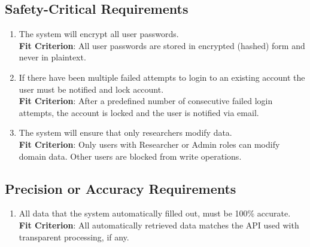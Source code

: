 \documentclass[12pt]{article}
\begin{document}
\subsection{Safety-Critical Requirements}
\begin{enumerate}[label=PR-SC\arabic*]
  \item The system will encrypt all user passwords.
  \\ \textbf{Fit Criterion}: All user passwords are stored in encrypted (hashed) form and never in plaintext.
  \item If there have been multiple failed attempts to login to an existing account the user must be notified and lock account.
  \\ \textbf{Fit Criterion}: After a predefined number of consecutive failed login attempts, the account is locked and the user is notified via email.
  \item The system will ensure that only researchers modify data.
  \\ \textbf{Fit Criterion}: Only users with Researcher or Admin roles can modify domain data. Other users are blocked from write operations.
\end{enumerate}\subsection{Precision or Accuracy Requirements}
\begin{enumerate}[label=PR-PA\arabic*]
  \item All data that the system automatically filled out, must be 100\% accurate.
  \\ \textbf{Fit Criterion}: All automatically retrieved data matches the API used with transparent processing, if any.
  \end{enumerate}
\end{document}
